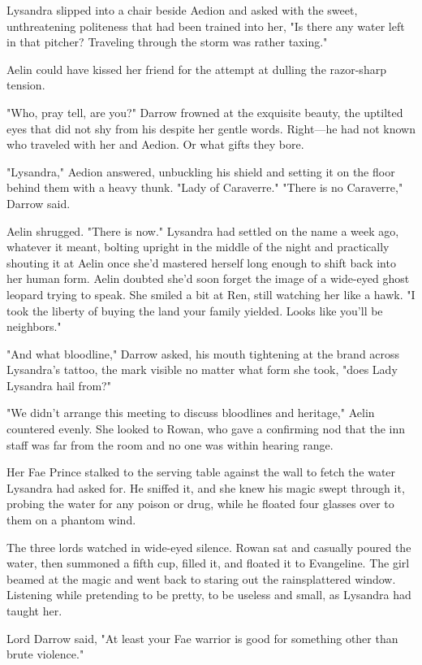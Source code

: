 Lysandra slipped into a chair beside Aedion and asked with the sweet, unthreatening politeness that had been trained into her, "Is there any water left in that pitcher? 
Traveling through the storm was rather taxing."

Aelin could have kissed her friend for the attempt at dulling the razor-sharp tension.

"Who, pray tell, are you?" 
Darrow frowned at the exquisite beauty, the uptilted eyes that did not shy from his despite her gentle words. 
Right---he had not known who traveled with her and Aedion. 
Or what gifts they bore.

"Lysandra," Aedion answered, unbuckling his shield and setting it on the floor behind them with a heavy thunk. 
"Lady of Caraverre."
"There is no Caraverre," Darrow said.

Aelin shrugged. 
"There is now." 
Lysandra had settled on the name a week ago, whatever it meant, bolting upright in the middle of the night and practically shouting it at Aelin once she'd mastered herself long enough to shift back into her human form. 
Aelin doubted she'd soon forget the image of a wide-eyed ghost leopard trying to speak. 
She smiled a bit at Ren, still watching her like a hawk.
"I took the liberty of buying the land your family yielded.
Looks like you'll be neighbors."

"And what bloodline," Darrow asked, his mouth tightening at the brand across Lysandra's tattoo, the mark visible no matter what form she took, "does Lady Lysandra hail from?"

"We didn't arrange this meeting to discuss bloodlines and heritage," Aelin countered evenly. 
She looked to Rowan, who gave a confirming nod that the inn staff was far from the room and no one was within hearing range.

Her Fae Prince stalked to the serving table against the wall to fetch the water Lysandra had asked for. 
He sniffed it, and she knew his magic swept through it, probing the water for any poison or drug, while he floated four glasses over to them on a phantom wind.

The three lords watched in wide-eyed silence. 
Rowan sat and casually poured the water, then summoned a fifth cup, filled it, and floated it to Evangeline. 
The girl beamed at the magic and went back to staring out the rainsplattered window. 
Listening while pretending to be pretty, to be useless and small, as Lysandra had taught her.

Lord Darrow said, "At least your Fae warrior is good for something other than brute violence."

